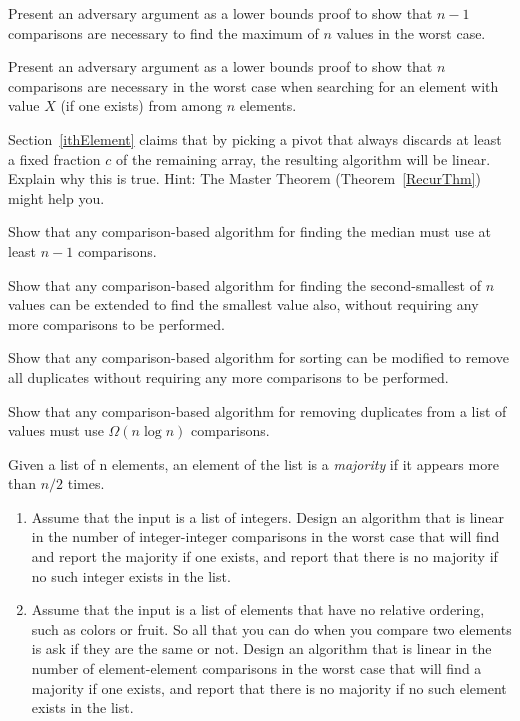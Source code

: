 \begin{exercises}
\item
Present an adversary argument as a lower bounds proof to show
that \(n-1\) comparisons are necessary to find the maximum of \(n\)
values in the worst case.

\item
Present an adversary argument as a lower bounds proof to show
that \(n\) comparisons are necessary in the worst case when searching for
an element with value \(X\) (if one exists) from among \(n\) elements.

\item
Section~\ref{ithElement} claims that by picking a pivot that always
discards at least a fixed fraction \(c\) of the remaining array, the
resulting algorithm will be linear.
Explain why this is true.
Hint: The Master Theorem (Theorem~\ref{RecurThm}) might help you.

\item
Show that any comparison-based algorithm for finding the median must
use at least \(n-1\) comparisons.

\item
Show that any comparison-based algorithm for finding the
second-smallest of \(n\) values can be extended to find the smallest
value also, without requiring any more comparisons to be performed.

\item
Show that any comparison-based algorithm for sorting can be modified
to remove all duplicates without requiring any more comparisons to be
performed.

\item  %
Show that any comparison-based algorithm for removing duplicates from
a list of values must use \(\Omega(n \log n)\) comparisons.

\item
Given a list of n elements, an element of the list is a
\emph{majority} if it appears more than \(n/2\) times.

\begin{enumerate}
\item
Assume that the input is a list of integers.
Design an algorithm that is linear in the number of integer-integer
comparisons in the worst case that will find and report the majority
if one exists, and report that there is no majority if no 
such integer exists in the list.

\item
Assume that the input is a list of elements that have no relative
ordering, such as colors or fruit.
So all that you can do when you compare two elements is ask if they
are the same or not.
Design an algorithm that is linear in the number of element-element
comparisons in the worst case that will find a majority if one exists,
and report that there is no majority if no 
such element exists in the list.
\end{enumerate}


\end{exercises}
